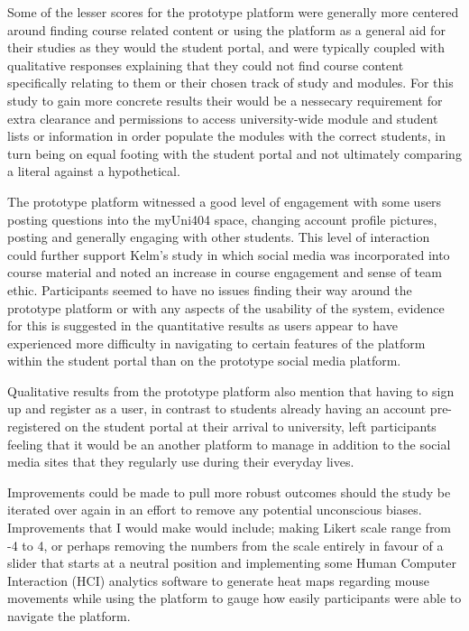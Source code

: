 \documentclass[lettersize,journal]{IEEEtran}
\begin{document}
Some of the lesser scores for the prototype platform were generally more centered around finding course related content or using the platform as a general aid for their studies as they would the
student portal, and were typically coupled with qualitative responses explaining that they could not find course content specifically relating to them or their chosen track of study and modules.
For this study to gain more concrete results their would be a nessecary requirement for extra clearance and permissions to access university-wide module and student lists or information in order
populate the modules with the correct students, in turn being on equal footing with the student portal and not ultimately comparing a literal against a hypothetical.

The prototype platform witnessed a good level of engagement with some users posting questions into the myUni404 space, changing account profile pictures, posting and generally engaging with other
students. This level of interaction could further support Kelm's \cite{Kelm2011} study in which social media was incorporated into course material and noted an increase in course engagement and sense of
team ethic. Participants seemed to have no issues finding their way around the prototype platform or with any aspects of the usability of the system, evidence for this is suggested in the quantitative
results as users appear to have experienced more difficulty in navigating to certain features of the platform within the student portal than on the prototype social media platform.

Qualitative results from the prototype platform also mention that having to sign up and register as a user, in contrast to students already having an account pre-registered on the student portal
at their arrival to university, left participants feeling that it would be an another platform to manage in addition to the social media sites that they regularly use during their everyday lives.

Improvements could be made to pull more robust outcomes should the study be iterated over again in an effort to remove any potential unconscious biases. Improvements that I would make would include; making
Likert scale range from -4 to 4, or perhaps removing the numbers from the scale entirely in favour of a slider that starts at a neutral position and implementing some Human Computer Interaction
(HCI) analytics software to generate heat maps regarding mouse movements while using the platform to gauge how easily participants were able to navigate the platform.
\end{document}
